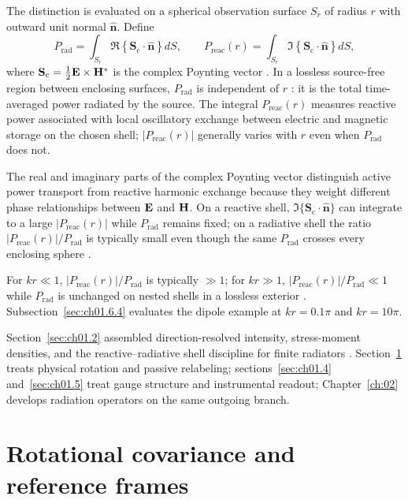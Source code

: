 The distinction is evaluated on a spherical observation surface $S_r$ of radius $r$ with outward unit normal $\hat{\mathbf{n}}$. Define
\begin{equation}
\label{eq:ch1.ex64-power-functionals}
P_{\mathrm{rad}}=\int_{S_r}\Re\!\left\{\mathbf{S}_\mathrm{c}\cdot\hat{\mathbf{n}}\right\}dS,\qquad
P_{\mathrm{reac}}(r)=\int_{S_r}\Im\!\left\{\mathbf{S}_\mathrm{c}\cdot\hat{\mathbf{n}}\right\}dS,
\end{equation}
where \(\mathbf{S}_\mathrm{c}=\tfrac{1}{2}\mathbf{E}\times\mathbf{H}^*\) is the complex Poynting vector
\cite{poynting1884}. In a lossless source-free region between enclosing surfaces, $P_{\mathrm{rad}}$ is independent of $r$ \cite{stratton1941}: it is the total time-averaged power radiated by the source. The integral $P_{\mathrm{reac}}(r)$ measures reactive power associated with local oscillatory exchange between electric and magnetic storage on the chosen shell; $|P_{\mathrm{reac}}(r)|$ generally varies with $r$ even when $P_{\mathrm{rad}}$ does not.

The real and imaginary parts of the complex Poynting vector distinguish active power transport from reactive harmonic exchange because they weight different phase relationships between \(\mathbf{E}\) and \(\mathbf{H}\). On a reactive shell, \(\Im\{\mathbf{S}_\mathrm{c}\cdot\hat{\mathbf{n}}\}\) can integrate to a large \(|P_{\mathrm{reac}}(r)|\) while \(P_{\mathrm{rad}}\) remains fixed; on a radiative shell the ratio \(|P_{\mathrm{reac}}(r)|/P_{\mathrm{rad}}\) is typically small even though the same $P_{\mathrm{rad}}$ crosses every enclosing sphere \cite{poynting1884,stratton1941}.

For \(kr\ll 1\), \(|P_{\mathrm{reac}}(r)|/P_{\mathrm{rad}}\) is typically \(\gg 1\); for \(kr\gg 1\), \(|P_{\mathrm{reac}}(r)|/P_{\mathrm{rad}}\ll 1\) while \(P_{\mathrm{rad}}\) is unchanged on nested shells in a lossless exterior \cite{stratton1941,poynting1884,harrington2001}. Subsection~\ref{sec:ch01.6.4} evaluates the dipole example at \(kr=0.1\pi\) and \(kr=10\pi\).

Section~\ref{sec:ch01.2} assembled direction-resolved intensity, stress-moment densities, and the reactive--radiative shell discipline for finite radiators \cite{chu1948,stratton1941}. Section~\ref{sec:ch01.3} treats physical rotation and passive relabeling; sections~\ref{sec:ch01.4} and~\ref{sec:ch01.5} treat gauge structure and instrumental readout; Chapter~\ref{ch:02} develops radiation operators on the same outgoing branch.

\section{Rotational covariance and reference frames}
\label{sec:ch01.3}

